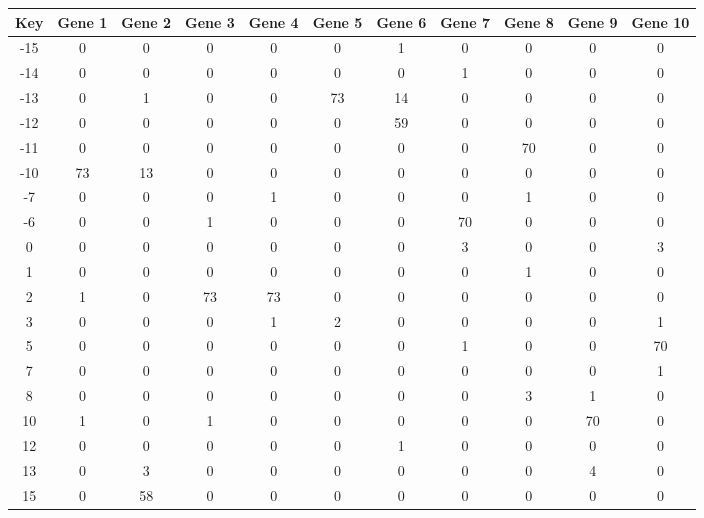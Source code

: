 \begin{tabular}{|c|c|c|c|c|c|c|c|c|c|c|}
\hline
Key & Gene 1 & Gene 2 & Gene 3 & Gene 4 & Gene 5 & Gene 6 & Gene 7 & Gene 8 & Gene 9 & Gene 10 \\
\hline
-15 & 0 & 0 & 0 & 0 & 0 & 1 & 0 & 0 & 0 & 0 \\
-14 & 0 & 0 & 0 & 0 & 0 & 0 & 1 & 0 & 0 & 0 \\
-13 & 0 & 1 & 0 & 0 & 73 & 14 & 0 & 0 & 0 & 0 \\
-12 & 0 & 0 & 0 & 0 & 0 & 59 & 0 & 0 & 0 & 0 \\
-11 & 0 & 0 & 0 & 0 & 0 & 0 & 0 & 70 & 0 & 0 \\
-10 & 73 & 13 & 0 & 0 & 0 & 0 & 0 & 0 & 0 & 0 \\
-7 & 0 & 0 & 0 & 1 & 0 & 0 & 0 & 1 & 0 & 0 \\
-6 & 0 & 0 & 1 & 0 & 0 & 0 & 70 & 0 & 0 & 0 \\
0 & 0 & 0 & 0 & 0 & 0 & 0 & 3 & 0 & 0 & 3 \\
1 & 0 & 0 & 0 & 0 & 0 & 0 & 0 & 1 & 0 & 0 \\
2 & 1 & 0 & 73 & 73 & 0 & 0 & 0 & 0 & 0 & 0 \\
3 & 0 & 0 & 0 & 1 & 2 & 0 & 0 & 0 & 0 & 1 \\
5 & 0 & 0 & 0 & 0 & 0 & 0 & 1 & 0 & 0 & 70 \\
7 & 0 & 0 & 0 & 0 & 0 & 0 & 0 & 0 & 0 & 1 \\
8 & 0 & 0 & 0 & 0 & 0 & 0 & 0 & 3 & 1 & 0 \\
10 & 1 & 0 & 1 & 0 & 0 & 0 & 0 & 0 & 70 & 0 \\
12 & 0 & 0 & 0 & 0 & 0 & 1 & 0 & 0 & 0 & 0 \\
13 & 0 & 3 & 0 & 0 & 0 & 0 & 0 & 0 & 4 & 0 \\
15 & 0 & 58 & 0 & 0 & 0 & 0 & 0 & 0 & 0 & 0 \\
\hline
\end{tabular}